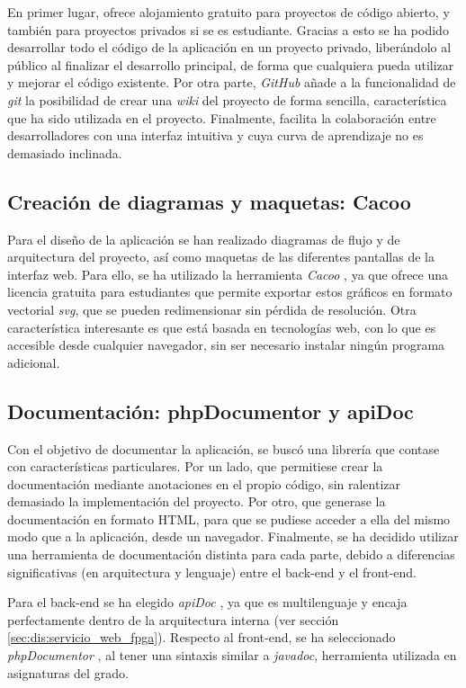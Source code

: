 En primer lugar, ofrece alojamiento gratuito para proyectos de código abierto, y también para proyectos privados si se es estudiante. Gracias a esto se ha podido desarrollar todo el código de la aplicación en un proyecto privado, liberándolo al público al finalizar el desarrollo principal, de forma que cualquiera pueda utilizar y mejorar el código existente. 
Por otra parte, \textit{GitHub} añade a la funcionalidad de \textit{git} la posibilidad de crear una \textit{wiki} del proyecto de forma sencilla, característica que ha sido utilizada en el proyecto.
Finalmente, facilita la colaboración entre desarrolladores con una interfaz intuitiva y cuya curva de aprendizaje no es demasiado inclinada. 

\subsection*{Creación de diagramas y maquetas: Cacoo\label{ssec:dp:cacoo}}

Para el diseño de la aplicación se han realizado diagramas de flujo y de arquitectura del proyecto, así como maquetas de las diferentes pantallas de la interfaz web.
Para ello, se ha utilizado la herramienta \textit{Cacoo} \cite{cacoo}, ya que ofrece una licencia gratuita para estudiantes que permite exportar estos gráficos en formato vectorial \textit{svg}, que se pueden redimensionar sin pérdida de resolución.
Otra característica interesante es que está basada en tecnologías web, con lo que es accesible desde cualquier navegador, sin ser necesario instalar ningún programa adicional.

\subsection*{Documentación: phpDocumentor y apiDoc\label{ssec:dp:docs}}

Con el objetivo de documentar la aplicación, se buscó una librería que contase con características particulares.
Por un lado, que permitiese crear la documentación mediante anotaciones en el propio código, sin ralentizar demasiado la implementación del proyecto.
Por otro, que generase la documentación en formato \gls{HTML}, para que se pudiese acceder a ella del mismo modo que a la aplicación, desde un navegador.
Finalmente, se ha decidido utilizar una herramienta de documentación distinta para cada parte, debido a diferencias significativas (en arquitectura y lenguaje) entre el \gls{back-end} y el \gls{front-end}.

Para el \gls{back-end} se ha elegido \textit{apiDoc} \cite{apidoc}, ya que es multilenguaje y encaja perfectamente dentro de la arquitectura interna (ver sección \ref{sec:dis:servicio_web_fpga}).
Respecto al \gls{front-end}, se ha seleccionado \textit{phpDocumentor} \cite{phpdocumentor}, al tener una sintaxis similar a \textit{javadoc}, herramienta utilizada en asignaturas del grado.

